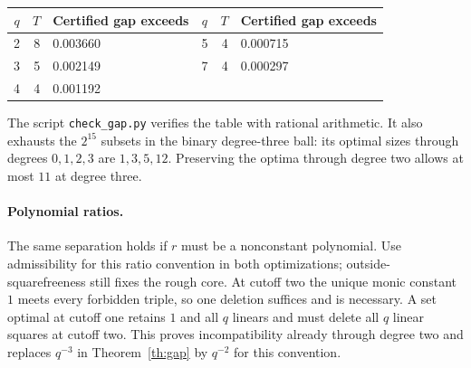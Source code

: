 \begin{center}\small
\begin{tabular}{c r l@{\qquad}c r l}\toprule
$q$&$T$&Certified gap exceeds&$q$&$T$&Certified gap exceeds\\\midrule
2&8&0.003660&5&4&0.000715\\
3&5&0.002149&7&4&0.000297\\
4&4&0.001192&&&\\\bottomrule
\end{tabular}
\end{center}
The script \texttt{check\_gap.py} verifies the table with rational arithmetic. It also exhausts the $2^{15}$ subsets in the binary degree-three ball: its optimal sizes through degrees $0,1,2,3$ are $1,3,5,12$. Preserving the optima through degree two allows at most $11$ at degree three.

\paragraph{Polynomial ratios.}
The same separation holds if $r$ must be a nonconstant polynomial. Use admissibility for this ratio convention in both optimizations; outside-squarefreeness still fixes the rough core. At cutoff two the unique monic constant $1$ meets every forbidden triple, so one deletion suffices and is necessary. A set optimal at cutoff one retains $1$ and all $q$ linears and must delete all $q$ linear squares at cutoff two. This proves incompatibility already through degree two and replaces $q^{-3}$ in Theorem~\ref{th:gap} by $q^{-2}$ for this convention.
